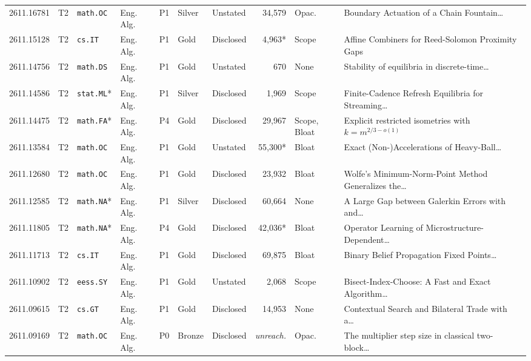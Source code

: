 \documentclass[11pt,letterpaper]{article}
\begin{document}
\begin{table}[p]
\begin{tabularx}{\textwidth}{lllllllrlX}
2611.16781 & T2 & \texttt{math.OC} & Eng. Alg. & P1 & Silver & Unstated & 34,579 & Opac. & Boundary Actuation of a Chain Fountain\dots~\cite{arxiv2611_16781} \\
2611.15128 & T2 & \texttt{cs.IT} & Eng. Alg. & P1 & Gold & Disclosed & 4,963* & Scope & Affine Combiners for Reed-Solomon Proximity Gaps~\cite{arxiv2611_15128} \\
2611.14756 & T2 & \texttt{math.DS} & Eng. Alg. & P1 & Gold & Unstated & 670 & None & Stability of equilibria in discrete-time\dots~\cite{arxiv2611_14756} \\
2611.14586 & T2 & \texttt{stat.ML}* & Eng. Alg. & P1 & Silver & Disclosed & 1,969 & Scope & Finite-Cadence Refresh Equilibria for Streaming\dots~\cite{arxiv2611_14586} \\
2611.14475 & T2 & \texttt{math.FA}* & Eng. Alg. & P4 & Gold & Disclosed & 29,967 & Scope, Bloat & Explicit restricted isometries with $k=m^{2/3-o(1)}$~\cite{arxiv2611_14475} \\
2611.13584 & T2 & \texttt{math.OC} & Eng. Alg. & P1 & Gold & Unstated & 55,300* & Bloat & Exact (Non-)Accelerations of Heavy-Ball\dots~\cite{arxiv2611_13584} \\
2611.12680 & T2 & \texttt{math.OC} & Eng. Alg. & P1 & Gold & Disclosed & 23,932 & Bloat & Wolfe's Minimum-Norm-Point Method Generalizes the\dots~\cite{arxiv2611_12680} \\
2611.12585 & T2 & \texttt{math.NA}* & Eng. Alg. & P1 & Silver & Disclosed & 60,664 & None & A Large Gap between Galerkin Errors with and\dots~\cite{arxiv2611_12585} \\
2611.11805 & T2 & \texttt{math.NA}* & Eng. Alg. & P4 & Gold & Disclosed & 42,036* & Bloat & Operator Learning of Microstructure-Dependent\dots~\cite{arxiv2611_11805} \\
2611.11713 & T2 & \texttt{cs.IT} & Eng. Alg. & P1 & Gold & Disclosed & 69,875 & Bloat & Binary Belief Propagation Fixed Points\dots~\cite{arxiv2611_11713} \\
2611.10902 & T2 & \texttt{eess.SY} & Eng. Alg. & P1 & Gold & Unstated & 2,068 & Scope & Bisect-Index-Choose: A Fast and Exact Algorithm\dots~\cite{arxiv2611_10902} \\
2611.09615 & T2 & \texttt{cs.GT} & Eng. Alg. & P1 & Gold & Disclosed & 14,953 & None & Contextual Search and Bilateral Trade with a\dots~\cite{arxiv2611_09615} \\
2611.09169 & T2 & \texttt{math.OC} & Eng. Alg. & P0 & Bronze & Disclosed & \emph{unreach.} & Opac. & The multiplier step size in classical two-block\dots~\cite{arxiv2611_09169} \\

\end{tabularx}
\end{table}
\end{document}
